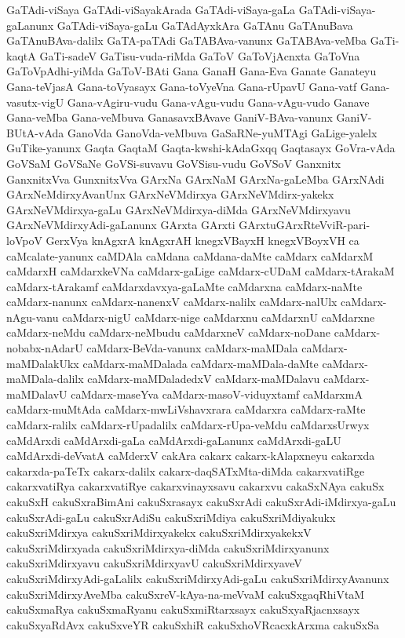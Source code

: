 {GaTAdi-viSaya
GaTAdi-viSayakArada
GaTAdi-viSaya-gaLa
GaTAdi-viSaya-gaLanunx
GaTAdi-viSaya-gaLu
GaTAdAyxkAra
GaTAnu
GaTAnuBava
GaTAnuBAva-dalilx
GaTA-paTAdi
GaTABAva-vanunx
GaTABAva-veMba
GaTi-kaqtA
GaTi-sadeV
GaTisu-vuda-riMda
GaToV
GaToVjAcnxta
GaToVna
GaToVpAdhi-yiMda
GaToV-BAti
Gana
GanaH
Gana-Eva
Ganate
Ganateyu
Gana-teVjasA
Gana-toVyasayx
Gana-toVyeVna
Gana-rUpavU
Gana-vatf
Gana-vasutx-vigU
Gana-vAgiru-vudu
Gana-vAgu-vudu
Gana-vAgu-vudo
Ganave
Gana-veMba
Gana-veMbuva
GanasavxBAvave
GaniV-BAva-vanunx
GaniV-BUtA-vAda
GanoVda
GanoVda-veMbuva
GaSaRNe-yuMTAgi
GaLige-yalelx
GuTike-yanunx
Gaqta
GaqtaM
Gaqta-kwshi-kAdaGxqq
Gaqtasayx
GoVra-vAda
GoVSaM
GoVSaNe
GoVSi-suvavu
GoVSisu-vudu
GoVSoV
Ganxnitx
GanxnitxVva
GunxnitxVva
GArxNa
GArxNaM
GArxNa-gaLeMba
GArxNAdi
GArxNeMdirxyAvanUnx
GArxNeVMdirxya
GArxNeVMdirx-yakekx
GArxNeVMdirxya-gaLu
GArxNeVMdirxya-diMda
GArxNeVMdirxyavu
GArxNeVMdirxyAdi-gaLanunx
GArxta
GArxti
GArxtuGArxRteVviR-pari-loVpoV
GerxVya
knAgxrA
knAgxrAH
knegxVBayxH
knegxVBoyxVH
ca
caMcalate-yanunx
caMDAla
caMdana
caMdana-daMte
caMdarx
caMdarxM
caMdarxH
caMdarxkeVNa
caMdarx-gaLige
caMdarx-cUDaM
caMdarx-tArakaM
caMdarx-tArakamf
caMdarxdavxya-gaLaMte
caMdarxna
caMdarx-naMte
caMdarx-nanunx
caMdarx-nanenxV
caMdarx-nalilx
caMdarx-nalUlx
caMdarx-nAgu-vanu
caMdarx-nigU
caMdarx-nige
caMdarxnu
caMdarxnU
caMdarxne
caMdarx-neMdu
caMdarx-neMbudu
caMdarxneV
caMdarx-noDane
caMdarx-nobabx-nAdarU
caMdarx-BeVda-vanunx
caMdarx-maMDala
caMdarx-maMDalakUkx
caMdarx-maMDalada
caMdarx-maMDala-daMte
caMdarx-maMDala-dalilx
caMdarx-maMDaladedxV
caMdarx-maMDalavu
caMdarx-maMDalavU
caMdarx-maseYva
caMdarx-masoV-viduyxtamf
caMdarxmA
caMdarx-muMtAda
caMdarx-mwLiVshavxrara
caMdarxra
caMdarx-raMte
caMdarx-ralilx
caMdarx-rUpadalilx
caMdarx-rUpa-veMdu
caMdarxsUrwyx
caMdArxdi
caMdArxdi-gaLa
caMdArxdi-gaLanunx
caMdArxdi-gaLU
caMdArxdi-deVvatA
caMderxV
cakAra
cakarx
cakarx-kAlapxneyu
cakarxda
cakarxda-paTeTx
cakarx-dalilx
cakarx-daqSATxMta-diMda
cakarxvatiRge
cakarxvatiRya
cakarxvatiRye
cakarxvinayxsavu
cakarxvu
cakaSxNAya
cakuSx
cakuSxH
cakuSxraBimAni
cakuSxrasayx
cakuSxrAdi
cakuSxrAdi-iMdirxya-gaLu
cakuSxrAdi-gaLu
cakuSxrAdiSu
cakuSxriMdiya
cakuSxriMdiyakukx
cakuSxriMdirxya
cakuSxriMdirxyakekx
cakuSxriMdirxyakekxV
cakuSxriMdirxyada
cakuSxriMdirxya-diMda
cakuSxriMdirxyanunx
cakuSxriMdirxyavu
cakuSxriMdirxyavU
cakuSxriMdirxyaveV
cakuSxriMdirxyAdi-gaLalilx
cakuSxriMdirxyAdi-gaLu
cakuSxriMdirxyAvanunx
cakuSxriMdirxyAveMba
cakuSxreV-kAya-na-meVvaM
cakuSxgaqRhiVtaM
cakuSxmaRya
cakuSxmaRyanu
cakuSxmiRtarxsayx
cakuSxyaRjacnxsayx
cakuSxyaRdAvx
cakuSxveYR
cakuSxhiR
cakuSxhoVRcacxkArxma
cakuSxSa
}
